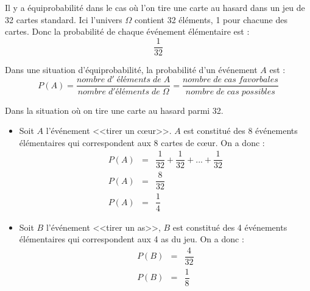 \documentclass[12pt,a4paper]{article}
\begin{document}
\begin{myex}
	Il y a équiprobabilité dans le cas où l'on tire une carte au hasard dans un jeu de 32 cartes standard. Ici l'univers $\Omega$ contient 32 éléments, 1 pour chacune des cartes. Donc la probabilité de chaque événement élémentaire est :
	\begin{equation*}
		\dfrac{1}{32}
	\end{equation*}
\end{myex}

\begin{mybilan}
	Dans une situation d'équiprobabilité, la probabilité d'un événement $A$ est :
	\begin{equation*}
		P(A)=\dfrac{nombre\;d'\;éléments\;de\;A}{nombre\; d'éléments\; de\; \Omega}=\dfrac{nombre\; de\; cas\;favorbales}{nombre\; de\; cas\;possibles}
	\end{equation*}
\end{mybilan}

\begin{myex}
	Dans la situation où on tire une carte au hasard parmi 32. 
	\begin{itemize}
		\item Soit $A$ l'événement <<tirer un c\oe ur>>. $A$ est constitué des 8 événements élémentaires qui correspondent aux 8 cartes de c\oe ur. On a donc :
		\begin{eqnarray*}
			P(A)&=&\dfrac{1}{32}+\dfrac{1}{32}+...+\dfrac{1}{32}\\
			P(A)&=&\dfrac{8}{32}\\
			P(A)&=&\dfrac{1}{4}
		\end{eqnarray*}
	
		\item Soit $B$ l'événement <<tirer un as>>, $B$ est constitué des 4 événements élémentaires qui correspondent aux 4 as du jeu. On a donc : 
		\begin{eqnarray*}
			P(B)&=&\dfrac{4}{32}\\
			P(B)&=&\dfrac{1}{8}
		\end{eqnarray*}
	\end{itemize}
\end{myex}
\end{document}

